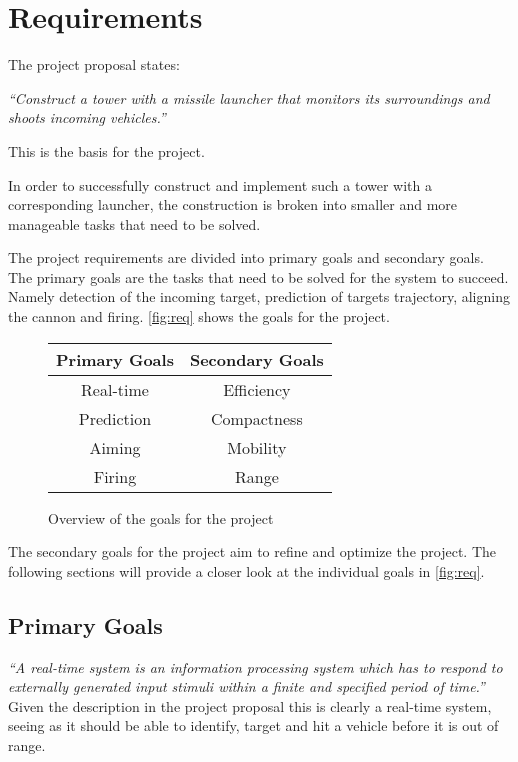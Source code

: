 \section{Requirements}
The project proposal states: 

\emph{``Construct a tower with a missile launcher that monitors its surroundings and shoots incoming vehicles.''} 

This is the basis for the project.

In order to successfully construct and implement such a tower with a corresponding launcher, the construction is broken into smaller and more manageable tasks that need to be solved.

The project requirements are divided into primary goals and secondary goals. The primary goals are the tasks that need to be solved for the system to succeed. Namely detection of the incoming target, prediction of targets trajectory, aligning the cannon and firing. \autoref{fig:req} shows the goals for the project.

\begin{figure}[hptb]
\centering
\begin{tabular}{ c c}
\textbf{Primary Goals} & \textbf{Secondary Goals}\\ [0.5ex]
\hline
Real-time &   Efficiency\\
Prediction&	Compactness\\
Aiming	  &	Mobility\\
Firing    &   Range\\[1ex]
\hline
\end{tabular}
\caption{Overview of the goals for the project}
\label{fig:req}
\end{figure}

The secondary goals for the project aim to refine and optimize the project. 
The following sections will provide a closer look at the individual goals in \autoref{fig:req}.


\subsection{Primary Goals} %
\label{sub:real_time_aspects}
\emph{``A real-time system is an information processing system which has to
respond to externally generated input stimuli within a finite and specified
period of time.''\cite{realtime}}\\

Given the description in the project proposal this is clearly a real-time system, seeing as it should be able to identify, target and hit a vehicle before it is out of range. 

